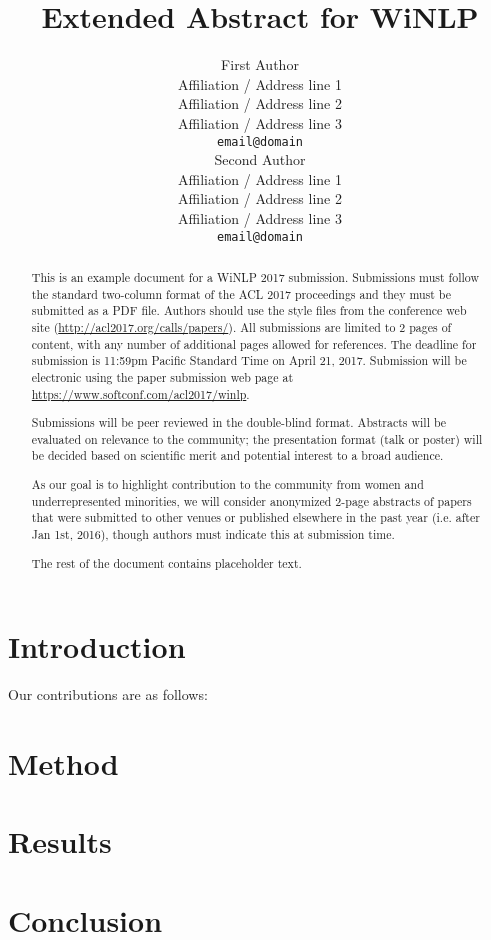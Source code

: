 \documentclass[11pt,a4paper]{article}
\title{Extended Abstract for WiNLP}
\author{First Author \\
  Affiliation / Address line 1 \\
  Affiliation / Address line 2 \\
  Affiliation / Address line 3 \\
  {\tt email@domain} \\\And
  Second Author \\
  Affiliation / Address line 1 \\
  Affiliation / Address line 2 \\
  Affiliation / Address line 3 \\
  {\tt email@domain} \\}
\date{}
\begin{document}
\maketitle
\begin{abstract}
This is an example document for a WiNLP 2017 submission. 
Submissions must follow the standard two-column format of the ACL 2017 proceedings and they must be submitted as a PDF file. Authors should use the style files from the conference web site (\url{http://acl2017.org/calls/papers/}).
All submissions are limited to 2 pages of content, with any number of additional pages allowed for references.
The deadline for submission is 11:59pm Pacific Standard Time on April 21, 2017. Submission will be electronic using the paper submission web page at \url{https://www.softconf.com/acl2017/winlp}.

Submissions will be peer reviewed in the double-blind format. Abstracts will be evaluated on relevance to the community; the presentation format (talk or poster) will be decided based on scientific merit and potential interest to a broad audience.

As our goal is to highlight contribution to the community from women and underrepresented minorities, we will consider anonymized 2-page abstracts of papers that were submitted to other venues or published elsewhere in the past year (i.e. after Jan 1st, 2016), though authors must indicate this at submission time.

The rest of the document contains placeholder text.
\end{abstract}


\section{Introduction}

\blindtext[1] \cite{Aho:72,Chandra:81,Gusfield:97,APA:83,ACM:83}

Our contributions are as follows:
\blinditemize

\section{Method}

\blindmathtrue
\blindtext[4] \cite{APA:83,ACM:83}
\blindmathfalse


\section{Results}

\blindtext[2]

\section{Conclusion}

\blindtext[2.5]


%
%


\end{document}
